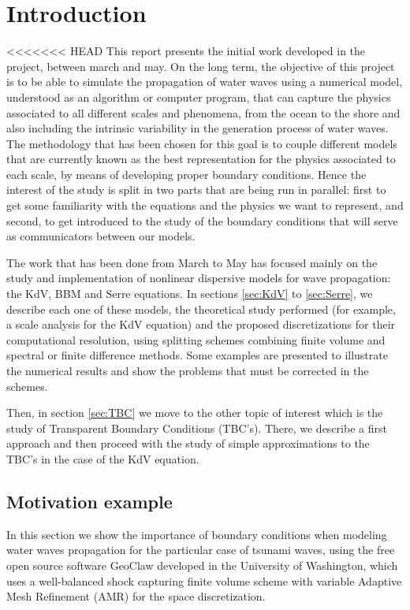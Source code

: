 \section{Introduction}

<<<<<<< HEAD
\indent This report presents the initial work developed in the project, between march and may. On the long term, the objective of this project is to be able to simulate the propagation of water waves using a numerical model, understood as an algorithm or computer program, that can capture the physics associated to all different scales and phenomena, from the ocean to the shore and also including the intrinsic variability in the generation process of water waves. The methodology that has been chosen for this goal is to couple different models that are currently known as the best representation for the physics associated to each scale, by means of developing proper boundary conditions. Hence the interest of the study is split in two parts that are being run in parallel: first to get some familiarity with the equations and the physics we want to represent, and second, to get introduced to the study of the boundary conditions that will serve as communicators between our models.

The work that has been done from March to May has focused mainly on the study and implementation of nonlinear dispersive models for wave propagation: the KdV, BBM and Serre equations. In sections \ref{sec:KdV} to \ref{sec:Serre}, we describe each one of these models, the theoretical study performed (for example, a scale analysis for the KdV equation) and the proposed discretizations for their computational resolution, using splitting schemes combining finite volume and spectral or finite difference methods. Some examples are presented to illustrate the numerical results and show the problems that must be corrected in the schemes.

\indent Then, in section \ref{sec:TBC} we move to the other topic of interest which is the study of Transparent Boundary Conditions (TBC's). There, we describe a first approach and then proceed with the study of simple approximations to the TBC's in the case of the KdV equation.

\subsection{Motivation example}

In this section we show the importance of boundary conditions when modeling water waves propagation for the particular case of tsunami waves, using the free open source software GeoClaw \cite{geoclaw} developed in the University of Washington, which uses a well-balanced shock capturing finite volume scheme with variable Adaptive Mesh Refinement (AMR) for the space discretization.

